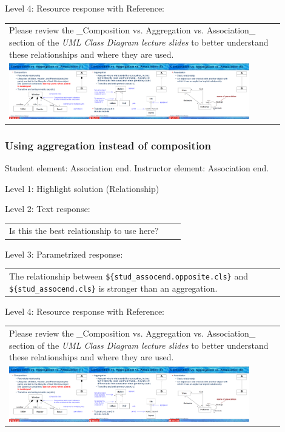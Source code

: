 \noindent Level 4: Resource response with Reference: \medskip

\begin{tabular}{|p{0.9\linewidth}}
Please review the _Composition vs. Aggregation vs. Association_ section of 
the \textit{UML Class Diagram lecture slides} to 
better understand these relationships and where they are used.

\\
\includegraphics[width=0.9\textwidth]{images/composition_aggregation_association.png}
\end{tabular} \medskip


\subsubsection{Using aggregation instead of composition}

Student element: Association end. Instructor element: Association end. \medskip

\noindent Level 1: Highlight solution (Relationship) \medskip

\noindent Level 2: Text response: \medskip

\begin{tabular}{|p{0.9\linewidth}}
Is this the best relationship to use here?
\end{tabular} \medskip

\noindent Level 3: Parametrized response: \medskip

\begin{tabular}{|p{0.9\linewidth}}
The relationship between \verb|${stud_assocend.opposite.cls}| and \verb|${stud_assocend.cls}| is stronger than an aggregation.
\end{tabular} \medskip

\noindent Level 4: Resource response with Reference: \medskip

\begin{tabular}{|p{0.9\linewidth}}
Please review the _Composition vs. Aggregation vs. Association_ section of 
the \textit{UML Class Diagram lecture slides} to 
better understand these relationships and where they are used.

\\
\includegraphics[width=0.9\textwidth]{images/composition_aggregation_association.png}
\end{tabular} \medskip


